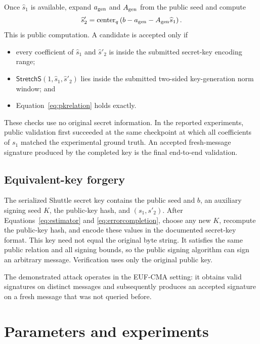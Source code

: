 \documentclass[11pt,a4paper]{article}
\newcommand{\Stretch}{\mathsf{StretchS}}
\begin{document}
Once $\widehat s_1$ is available, expand $a_{\rm gen}$ and $A_{\rm gen}$ from
the public seed and compute
\begin{equation}
 \widehat s'_2=\operatorname{center}_q
       \left(b-a_{\rm gen}-A_{\rm gen}\widehat s_1\right).
\label{eq:errorcompletion}
\end{equation}
This is public computation.  A candidate is accepted only if

\begin{itemize}[leftmargin=1.5em]
  \item every coefficient of $\widehat s_1$ and $\widehat s'_2$ is inside
        the submitted secret-key encoding range;
  \item $\Stretch(1,\widehat s_1,\widehat s'_2)$ lies inside the submitted
        two-sided key-generation norm window; and
  \item Equation~\eqref{eq:pkrelation} holds exactly.
\end{itemize}

These checks use no original secret information.  In the reported
experiments, public validation first succeeded at the same checkpoint at which
all coefficients of $s_1$ matched the experimental ground truth.  An accepted
fresh-message signature produced by the completed key is the final end-to-end
validation.

\subsection{Equivalent-key forgery}

The serialized Shuttle secret key contains the public seed and $b$, an
auxiliary signing seed $K$, the public-key hash, and $(s_1,s'_2)$.  After
Equations~\eqref{eq:estimator} and \eqref{eq:errorcompletion}, choose any new
$K$, recompute the public-key hash, and encode these values in the documented
secret-key format.  This key need not equal the original byte string.  It
satisfies the same public relation and all signing bounds, so the public
signing algorithm can sign an arbitrary message.  Verification uses only the
original public key.

The demonstrated attack operates in the EUF-CMA setting: it obtains valid
signatures on distinct messages and subsequently produces an accepted
signature on a fresh message that was not queried before.

\section{Parameters and experiments}
\label{sec:experiments}
\end{document}
